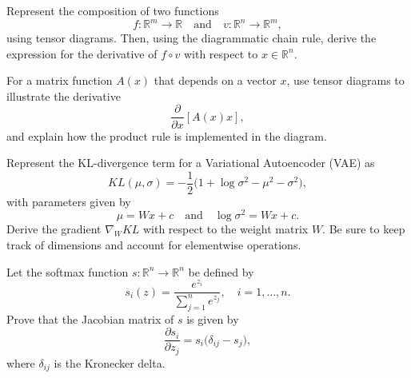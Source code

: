 \begin{exercise}
   Represent the composition of two functions 
   \[
      f:\mathbb{R}^m\to\mathbb{R} \quad \text{and} \quad v:\mathbb{R}^n\to\mathbb{R}^m,
   \]
   using tensor diagrams. Then, using the diagrammatic chain rule, derive the expression for the derivative of $f\circ v$ with respect to $x\in\mathbb{R}^n$.
\end{exercise}

\begin{exercise}
   For a matrix function $A(x)$ that depends on a vector $x$, use tensor diagrams to illustrate the derivative 
   \[
      \frac{\partial}{\partial x}[A(x)x],
   \]
   and explain how the product rule is implemented in the diagram.
\end{exercise}

\begin{exercise}
   Represent the KL-divergence term for a Variational Autoencoder (VAE) as
   \[
      KL(\mu,\sigma) = -\frac{1}{2}\Big(1 + \log\sigma^2 - \mu^2 - \sigma^2\Big),
   \]
   with parameters given by 
   \[
      \mu = W x + c \quad \text{and} \quad \log\sigma^2 = W x + c.
   \]
   Derive the gradient $\nabla_W KL$ with respect to the weight matrix $W$. Be sure to keep track of dimensions and account for elementwise operations.
\end{exercise}
\begin{exercise}
   Let the softmax function $s:\mathbb{R}^n \to \mathbb{R}^n$ be defined by
   \[
      s_i(z) = \frac{e^{z_i}}{\sum_{j=1}^n e^{z_j}}, \quad i=1,\dots,n.
   \]
   Prove that the Jacobian matrix of $s$ is given by
   \[
      \frac{\partial s_i}{\partial z_j} = s_i\big(\delta_{ij} - s_j\big),
   \]
   where $\delta_{ij}$ is the Kronecker delta.
\end{exercise}

